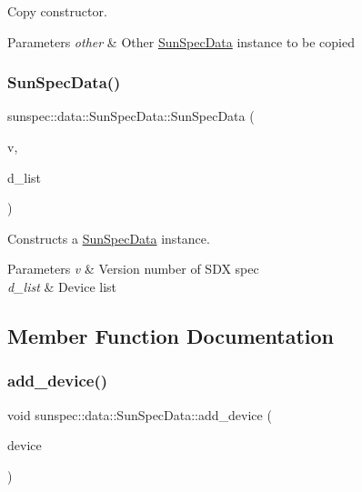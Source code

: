 Copy constructor. 
\begin{DoxyParams}{Parameters}
{\em other} & Other {\ttfamily \hyperlink{structsunspec_1_1data_1_1_sun_spec_data}{Sun\+Spec\+Data}} instance to be copied \\
\hline
\end{DoxyParams}
\mbox{\label{structsunspec_1_1data_1_1_sun_spec_data_a3e13d41d1dc8f1fc09a5eb80bb602795}} 
\subsubsection{\texorpdfstring{Sun\+Spec\+Data()}{SunSpecData()}\hspace{0.1cm}{\footnotesize\ttfamily [3/3]}}
{\footnotesize\ttfamily sunspec\+::data\+::\+Sun\+Spec\+Data\+::\+Sun\+Spec\+Data (\begin{DoxyParamCaption}\item[{std\+::string}]{v,  }\item[{device\+\_\+list\+\_\+type}]{d\+\_\+list }\end{DoxyParamCaption})\hspace{0.3cm}{\ttfamily [inline]}}

Constructs a {\ttfamily \hyperlink{structsunspec_1_1data_1_1_sun_spec_data}{Sun\+Spec\+Data}} instance. 
\begin{DoxyParams}{Parameters}
{\em v} & Version number of S\+DX spec \\
\hline
{\em d\+\_\+list} & Device list \\
\hline
\end{DoxyParams}


\subsection{Member Function Documentation}
\mbox{\label{structsunspec_1_1data_1_1_sun_spec_data_a9747c26b6951423f1cd1a17c39bd0878}} 
\subsubsection{\texorpdfstring{add\+\_\+device()}{add\_device()}}
{\footnotesize\ttfamily void sunspec\+::data\+::\+Sun\+Spec\+Data\+::add\+\_\+device (\begin{DoxyParamCaption}\item[{const \hyperlink{structsunspec_1_1data_1_1_device_data}{Device\+Data} \&}]{device }\end{DoxyParamCaption})}

